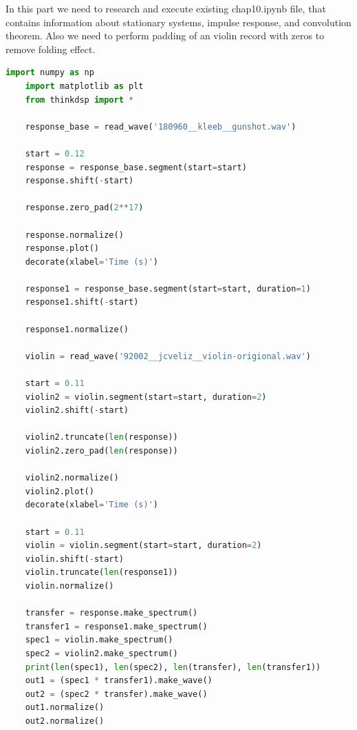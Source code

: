 \documentclass[a4paper]{article}
\begin{document}
        In this part we need to research and execute existing chap10.ipynb file, that contains information about stationary systems, impulse response, and convolution theorem. Also we need to perform padding of an violin record with zeros to remove folding effect.
        
        \begin{lstlisting}[language=Python,caption=Padding compare code,label={lst:part1_2}]
    import numpy as np
    import matplotlib as plt
    from thinkdsp import *
    
    response_base = read_wave('180960__kleeb__gunshot.wav')

    start = 0.12
    response = response_base.segment(start=start)
    response.shift(-start)
    
    response.zero_pad(2**17)
    
    response.normalize()
    response.plot()
    decorate(xlabel='Time (s)')
    
    response1 = response_base.segment(start=start, duration=1)
    response1.shift(-start)
    
    response1.normalize()
    
    violin = read_wave('92002__jcveliz__violin-origional.wav')

    start = 0.11
    violin2 = violin.segment(start=start, duration=2)
    violin2.shift(-start)
    
    violin2.truncate(len(response))
    violin2.zero_pad(len(response))
    
    violin2.normalize()
    violin2.plot()
    decorate(xlabel='Time (s)')
    
    start = 0.11
    violin = violin.segment(start=start, duration=2)
    violin.shift(-start)
    violin.truncate(len(response1))
    violin.normalize()
    
    transfer = response.make_spectrum()
    transfer1 = response1.make_spectrum()
    spec1 = violin.make_spectrum()
    spec2 = violin2.make_spectrum()
    print(len(spec1), len(spec2), len(transfer), len(transfer1))
    out1 = (spec1 * transfer1).make_wave()
    out2 = (spec2 * transfer).make_wave()
    out1.normalize()
    out2.normalize()
        \end{lstlisting}
        
\end{document}
